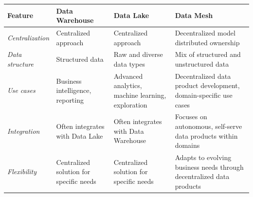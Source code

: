 \begin{table}[h]
    \centering
    \renewcommand{\arraystretch}{1.2}
    \begin{tabular}{|l|p{4cm}|p{4cm}|p{4cm}|}
        \hline
        \textbf{Feature} & \textbf{Data Warehouse} & \textbf{Data Lake} & \textbf{Data Mesh} \\
        \hline
        \textit{Centralization} & Centralized approach & Centralized approach & Decentralized model distributed ownership \\
        \hline
        \textit{Data structure} & Structured data & Raw and diverse data types & Mix of structured and unstructured data \\
        \hline
        \textit{Use cases} & Business intelligence, reporting & Advanced analytics, machine learning, exploration & Decentralized data product development, domain-specific use cases \\
        \hline
        \textit{Integration} & Often integrates with Data Lake & Often integrates with Data Warehouse & Focuses on autonomous, self-serve data products within domains \\
        \hline
        \textit{Flexibility} & Centralized solution for specific needs & Centralized solution for specific needs & Adapts to evolving business needs through decentralized data products \\
        \hline
    \end{tabular}
    \label{tab:data_comparison}
\end{table}


